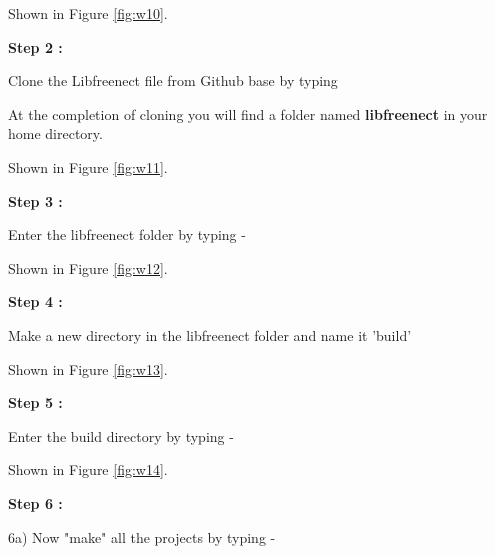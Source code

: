 \begin{flushleft}

\medskip
Shown in Figure \ref{fig:w10}.
\medskip

\textbf{Step 2 :}

\medskip

Clone the Libfreenect file from Github base by typing 

\medskip


\medskip

At the completion of cloning you will find a folder named \textbf{libfreenect} in your home directory.

\medskip
Shown in Figure \ref{fig:w11}.

\medskip
\textbf{Step 3 :}

\medskip

Enter the libfreenect folder by typing - 

\medskip


\medskip
Shown in Figure \ref{fig:w12}.

\medskip
\textbf{Step 4 :}

\medskip

Make a new directory in the libfreenect folder and name it 'build'

\medskip


\medskip
Shown in Figure \ref{fig:w13}.

\medskip
\textbf{Step 5 :}

\medskip

Enter the build directory by typing - 

\medskip


\medskip
Shown in Figure \ref{fig:w14}.

\medskip

\textbf{Step 6 :}

\medskip

6a) Now "make" all the projects by typing - 

\medskip


\end{flushleft}

